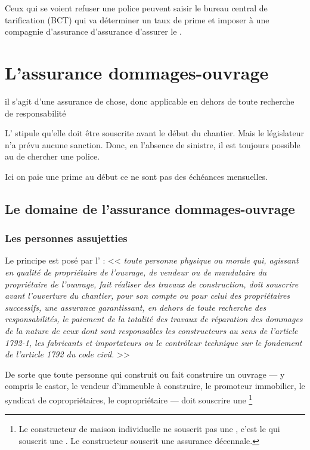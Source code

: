 		Ceux qui se voient refuser une police peuvent saisir le bureau central de tarification (BCT) qui va déterminer un taux de prime et imposer à une compagnie d'assurance d'assurance d'assurer le \lo.


\section{L'assurance dommages-ouvrage}

	il s'agit d'une assurance de chose, donc applicable en dehors de toute recherche de responsabilité

	L' stipule qu'elle doit être souscrite avant le début du chantier. Mais le législateur n’a prévu aucune sanction. Donc, en l'absence de sinistre, il est toujours possible au \Mo de chercher une police.

	Ici on paie une prime au début ce ne sont pas des échéances mensuelles.


	\subsection{Le domaine de l'assurance dommages-ouvrage}



		\subsubsection{Les personnes assujetties}

			Le principe est posé par l' : << {\itshape toute personne physique ou morale qui, agissant en qualité de propriétaire de l'ouvrage, de vendeur ou de mandataire du propriétaire de l'ouvrage, fait réaliser des travaux de construction, doit souscrire avant l'ouverture du chantier, pour son compte ou pour celui des propriétaires successifs, une assurance garantissant, en dehors de toute recherche des responsabilités, le paiement de la totalité des travaux de réparation des dommages de la nature de ceux dont sont responsables les constructeurs au sens de l'article 1792-1, les fabricants et importateurs ou le contrôleur technique sur le fondement de l'article 1792 du code civil.} >>

			De sorte que toute personne qui construit ou fait construire un ouvrage --- y compris le castor, le vendeur d’immeuble à construire, le promoteur immobilier, le syndicat de copropriétaires, le copropriétaire --- doit souscrire une \DO\footnote{Le constructeur de maison individuelle ne souscrit pas une \DO, c’est le \MO qui souscrit une \DO. Le constructeur souscrit une assurance décennale.}

